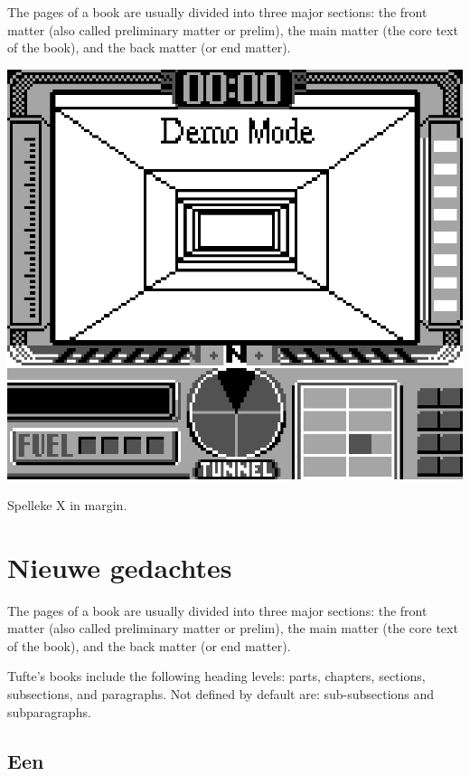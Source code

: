 \documentclass[
  english,
  symmetric,justified,marginals=raggedouter]{tufte-book}
\begin{document}
The pages of a book are usually divided into three major sections: the
front matter (also called preliminary matter or prelim), the main matter
(the core text of the book), and the back matter (or end matter).

\begin{marginfigure}%
  \includegraphics[width=\linewidth]{x.png}
  \caption{Spelleke X in margin.}
  \label{fig:marginfig}
\end{marginfigure}

\hypertarget{nieuwe-gedachtes}{%
\section{Nieuwe gedachtes}\label{nieuwe-gedachtes}}

The pages of a book are usually divided into three major sections: the
front matter (also called preliminary matter or prelim), the main matter
(the core text of the book), and the back matter (or end matter).

Tufte's books include the following heading levels: parts,
chapters, sections, subsections, and paragraphs. Not defined by
default are: sub-subsections and subparagraphs.

\hypertarget{een}{%
\subsection{Een}\label{een}}
\end{document}
